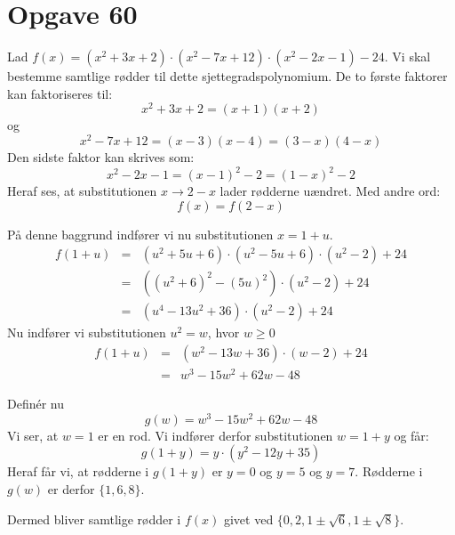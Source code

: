 \documentclass[12pt,oneside,a4paper]{article}
\newcommand{\bas}{\begin{eqnarray*}}
\newcommand{\eas}{\end{eqnarray*}}
\begin{document}
\section*{Opgave 60}
Lad $f(x) = \left(x^2+3x+2\right)\cdot\left(x^2-7x+12\right)\cdot\left(x^2-2x-1\right)-24$.
Vi skal bestemme samtlige rødder til dette sjettegradspolynomium. De to første faktorer kan faktoriseres til:
$$
x^2+3x+2 = (x+1)(x+2)
$$
og
$$
x^2-7x+12 = (x-3)(x-4) = (3-x)(4-x)
$$
Den sidste faktor kan skrives som:
$$
x^2-2x-1 = (x-1)^2 - 2 = (1-x)^2-2
$$
Heraf ses, at substitutionen $x \rightarrow 2-x$ lader rødderne uændret. Med andre ord:
$$
f(x) = f(2-x)
$$

På denne baggrund indfører vi nu substitutionen $x = 1+u$.
\bas
f(1+u) &=& \left(u^2+5u+6\right)\cdot\left(u^2-5u+6\right)\cdot\left(u^2-2\right)+24 \\
       &=& \left(\left(u^2+6\right)^2 - \left(5u\right)^2\right)\cdot\left(u^2-2\right)+24 \\
       &=& \left(u^4-13u^2+36\right)\cdot\left(u^2-2\right)+24
\eas
Nu indfører vi substitutionen $u^2=w$, hvor $w\ge 0$
\bas
f(1+u) &=& \left(w^2-13w+36\right)\cdot(w-2)+24\\
       &=& w^3-15w^2+62w-48
\eas

Definér nu
$$
g(w) = w^3-15w^2+62w-48
$$
Vi ser, at $w=1$ er en rod. Vi indfører derfor substitutionen $w=1+y$ og får:
$$
g(1+y) = y\cdot\left(y^2-12y+35\right)
$$
Heraf får vi, at rødderne i $g(1+y)$ er $y=0$ og $y=5$ og $y=7$.
Rødderne i $g(w)$ er derfor $\{1, 6, 8\}$.

Dermed bliver samtlige rødder i $f(x)$ givet ved $\{0, 2, 1\pm\sqrt{6}, 1\pm\sqrt{8}\}$.
\end{document}
